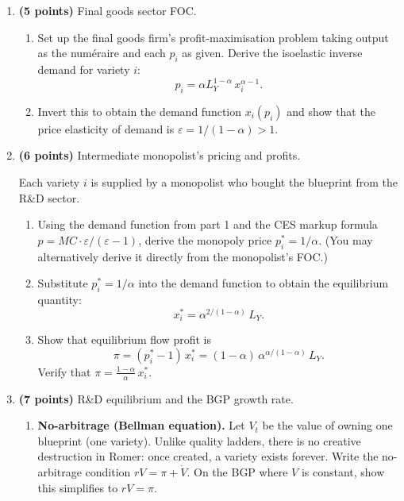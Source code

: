 \documentclass[a4paper,11pt]{article}
\begin{document}
\begin{enumerate}[label=\textbf{\arabic*.}, leftmargin=*, itemsep=6pt]

    \item \textbf{(5 points)} Final goods sector FOC.

    \begin{enumerate}[label=(\alph*), itemsep=4pt]
        \item Set up the final goods firm's profit-maximisation problem taking output as
        the num\'{e}raire and each $p_i$ as given.  Derive the isoelastic inverse demand
        for variety $i$:
        \[
            p_i = \alpha L_Y^{1-\alpha}\,x_i^{\alpha-1}.
        \]
        \item Invert this to obtain the demand function $x_i(p_i)$ and show that the price
        elasticity of demand is $\varepsilon = 1/(1-\alpha) > 1$.
    \end{enumerate}

    \item \textbf{(6 points)} Intermediate monopolist's pricing and profits.

    Each variety $i$ is supplied by a monopolist who bought the blueprint from the R\&D sector.

    \begin{enumerate}[label=(\alph*), itemsep=4pt]
        \item Using the demand function from part 1 and the CES markup formula
        $p = MC \cdot \varepsilon/(\varepsilon - 1)$, derive the monopoly price
        $p_i^* = 1/\alpha$.  (You may alternatively derive it directly from the
        monopolist's FOC.)
        \item Substitute $p_i^* = 1/\alpha$ into the demand function to obtain the
        equilibrium quantity:
        \[
            x_i^* = \alpha^{2/(1-\alpha)}\,L_Y.
        \]
        \item Show that equilibrium flow profit is
        \[
            \pi = (p_i^* - 1)\,x_i^* = (1-\alpha)\,\alpha^{\alpha/(1-\alpha)}\,L_Y.
        \]
        Verify that $\pi = \tfrac{1-\alpha}{\alpha}\,x_i^*$.
    \end{enumerate}

    \item \textbf{(7 points)} R\&D equilibrium and the BGP growth rate.

    \begin{enumerate}[label=(\alph*), itemsep=4pt]
        \item \textbf{No-arbitrage (Bellman equation).}  Let $V_t$ be the value of owning
        one blueprint (one variety).  Unlike quality ladders, there is no creative
        destruction in Romer: once created, a variety exists forever.  Write the
        no-arbitrage condition $r V = \pi + \dot{V}$.  On the BGP where $V$ is constant,
        show this simplifies to $r V = \pi$.


\end{enumerate}
\end{enumerate}
\end{document}
